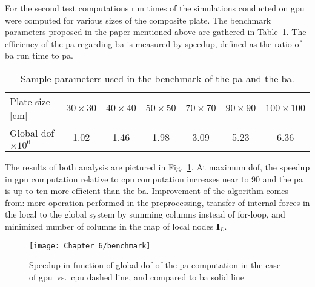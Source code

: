 For the second test computations run times of the simulations conducted on \ac{gpu} were computed for various sizes of the composite plate.
The benchmark parameters proposed in the paper mentioned above are gathered in Table~\ref{tab:benchmark}.
The efficiency of the \ac{pa} regarding \ac{ba} is measured by speedup, defined as the ratio of \ac{ba} run time to \ac{pa}.
\begin{table}[!t]
\tabcolsep=0.25cm
\centering
\caption{\label{tab:benchmark}Sample parameters used in the benchmark of the \ac{pa} and the \ac{ba}.}
	\begin{tabular}{lcccccc}
		\toprule
		Plate size [cm] & \(30\times30\) & \(40\times40\) & \(50\times50\) & \(70\times70\) & \(90\times90\) & \(100\times100\)\\
		Global \ac{dof}\(\times10^6\)&1.02&1.46&1.98&3.09&5.23&6.36\\ \bottomrule
	\end{tabular}
\end{table}

The results of both analysis are pictured in Fig.~\ref{fig:speedup}.
At maximum \ac{dof}, the speedup in \ac{gpu} computation relative to \ac{cpu} computation increases near to 90 and the \ac{pa} is up to ten more efficient than the \ac{ba}.
Improvement of the algorithm comes from: more operation performed in the preprocessing, transfer of internal forces in the local to the global system by summing columns instead of for-loop, and minimized number of columns in the map of local nodes $\textbf{I}_L$.
\begin{figure}[!tbh]
	\begin{center}
		\texttt{[image: Chapter\_6/benchmark]}
	\end{center}
	\caption{Speedup in function of global \ac{dof} of the \ac{pa} computation in the case of \ac{gpu}~vs.~\ac{cpu} dashed line, and compared to \ac{ba} solid line}
	\label{fig:speedup}
\end{figure}